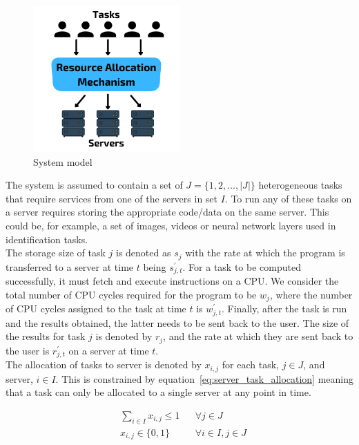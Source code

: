 \begin{figure}
    \centering
    \includegraphics[width=0.5\textwidth]{figures/3_solution_figs/system_model.pdf}
    \caption{System model}
    \label{fig:system_model}
\end{figure}

The system is assumed to contain a set of $J = \{1,2,\ldots,\left| J \right|\}$ heterogeneous tasks that require
services from one of the servers in set $I$. To run any of these tasks on a server requires storing the appropriate
code/data on the same server. This could be, for example, a set of images, videos or neural network layers used in
identification tasks. \\
The storage size of task $j$ is denoted as $s_j$ with the rate at which the program is transferred to a server at time
$t$ being $s^{'}_{j,t}$. For a task to be computed successfully, it must fetch and execute instructions
on a CPU. We consider the total number of CPU cycles required for the program to be $w_j$, where the number of
CPU cycles assigned to the task at time $t$ is $w^{'}_{j,t}$. Finally, after the task is run and
the results obtained, the latter needs to be sent back to the user. The size of the results for task $j$ is denoted by
$r_j$, and the rate at which they are sent back to the user is $r^{'}_{j,t}$ on a server at time $t$. \\
The allocation of tasks to server is denoted by $x_{i,j}$ for each task, $j \in J$, and server, $i \in I$. This is
constrained by equation~\eqref{eq:server_task_allocation} meaning that a task can only be allocated to a single server
at any point in time.

\begin{align}
    & \sum_{i \in I} x_{i,j} \leq 1 && \forall{j \in J} \label{eq:server_task_allocation} \\
    & x_{i,j} \in \{0, 1\} && \forall{i \in I, j \in J} \label{eq:server_task_binary}
\end{align}

